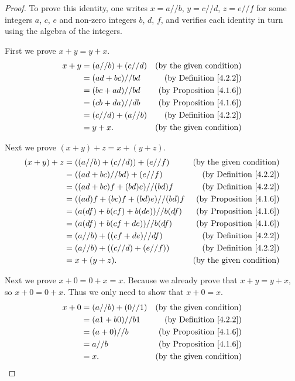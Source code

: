 \begin{proof}
To prove this identity, one writes \(x = a // b\), \(y = c // d\), \(z = e // f\) for some integers \(a\), \(c\), \(e\) and non-zero integers \(b\), \(d\), \(f\), and verifies each identity in turn using the algebra of the integers.

First we prove \(x + y = y + x\).
\begin{align*}
x + y &= (a // b) + (c // d) & \text{(by the given condition)} \\
&= (ad + bc) // bd & \text{(by Definition \ref{4.2.2})} \\
&= (bc + ad) // bd & \text{(by Proposition \ref{4.1.6})} \\
&= (cb + da) // db & \text{(by Proposition \ref{4.1.6})} \\
&= (c // d) + (a // b) & \text{(by Definition \ref{4.2.2})} \\
&= y + x. & \text{(by the given condition)}
\end{align*}

Next we prove \((x + y) + z = x + (y + z)\).
\begin{align*}
(x + y) + z &= ((a // b) + (c // d)) + (e // f) & \text{(by the given condition)} \\
&= ((ad + bc) // bd) + (e // f) & \text{(by Definition \ref{4.2.2})} \\
&= ((ad + bc)f + (bd)e) // (bd)f & \text{(by Definition \ref{4.2.2})} \\
&= ((ad)f + (bc)f + (bd)e) // (bd)f & \text{(by Proposition \ref{4.1.6})} \\
&= (a(df) + b(cf) + b(de)) // b(df) & \text{(by Proposition \ref{4.1.6})} \\
&= (a(df) + b(cf + de)) // b(df) & \text{(by Proposition \ref{4.1.6})} \\
&= (a // b) + ((cf + de) // df) & \text{(by Definition \ref{4.2.2})} \\
&= (a // b) + ((c // d) + (e // f)) & \text{(by Definition \ref{4.2.2})} \\
&= x + (y + z). & \text{(by the given condition)}
\end{align*}

Next we prove \(x + 0 = 0 + x = x\).
Because we already prove that \(x + y = y + x\), so \(x + 0 = 0 + x\).
Thus we only need to show that \(x + 0 = x\).
\begin{align*}
x + 0 &= (a // b) + (0 // 1) & \text{(by the given condition)} \\
&= (a1 + b0) // b1 & \text{(by Definition \ref{4.2.2})} \\
&= (a + 0) // b & \text{(by Proposition \ref{4.1.6})} \\
&= a // b & \text{(by Proposition \ref{4.1.6})} \\
&= x. & \text{(by the given condition)}
\end{align*}


\end{proof}

